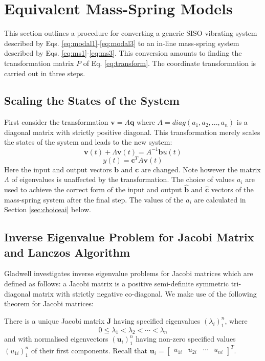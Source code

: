 \documentclass{mbd_fullpaper}
\begin{document}
\section{Equivalent Mass-Spring Models}
\label{sec:algorithms}
This section outlines a procedure for converting a generic SISO vibrating system described by Eqs. \ref{eq:modal1}-\ref{eq:modal3} to an in-line mass-spring system described by Eqs. \ref{eq:ms1}-\ref{eq:ms3}.
This conversion amounts to finding the transformation matrix $P$ of Eq. \ref{eq:transform}.
The coordinate transformation is carried out in three steps.

\subsection{Scaling the States of the System}
First consider the transformation $\mathbf{v} = A \mathbf{q}$ where $A = diag(a_1, a_2, ..., a_n)$ is a diagonal matrix with strictly positive diagonal.
This transformation merely scales the states of the system and leads to the new system:
\begin{equation}
\ddot{\mathbf{v}}(t) +  \Lambda \mathbf{v}(t) =  A^{-1} \mathbf{b}u(t)
\label{eq:scaled1}
\end{equation}
\begin{equation}
y(t) = \mathbf{c}^T  A \mathbf{v}(t)
\label{eq:scaled2}
\end{equation}
Here the input and output vectors $\mathbf{b}$ and $\mathbf{c}$ are changed. Note however the matrix $\Lambda$ of eigenvalues is unaffected by the transformation.
The choice of values $a_i$ are used to achieve the correct form of the input and output $\mathbf{\hat{b}}$ and $\mathbf{\hat{c}}$ vectors of the mass-spring system after the final step.
The values of the $a_i$ are calculated in Section \ref{sec:choiceai} below.

\subsection{Inverse Eigenvalue Problem for Jacobi Matrix and Lanczos Algorithm}
Gladwell \cite{gladwell1986inverse} investigates inverse eigenvalue problems for Jacobi matrices which are defined as follows:
a Jacobi matrix is a positive semi-definite symmetric tri-diagonal matrix with strictly negative co-diagonal.
We make use of the following theorem for Jacobi matrices:

There is a unique Jacobi matrix $\mathbf{J}$ having specified eigenvalues $(\lambda_i)_1^n$, where
\begin{equation}
0 \leq \lambda_1<\lambda_2< \cdots <\lambda_n
\label{eq:lambda}
\end{equation}
and with normalised eigenvectors $(\mathbf{u}_i)_1^n$  having non-zero specified values $(u_{1i})_1^n$ of their first components.
Recall that $\mathbf{u}_i = \begin{bmatrix} u_{1i} &  u_{2i} & \cdots & u_{ni} \end{bmatrix}^T$.
\end{document}
